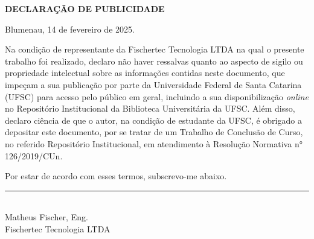 
% 

\begin{center}
	\textbf{DECLARAÇÃO DE PUBLICIDADE}
\end{center}



Blumenau, 14 de fevereiro de 2025.

\vspace{1cm}

Na condição de representante da Fischertec Tecnologia LTDA na qual o presente trabalho foi realizado, declaro não haver ressalvas quanto ao aspecto de sigilo ou propriedade intelectual sobre as informações contidas neste documento, que impeçam a sua publicação por parte da Universidade Federal de Santa Catarina (UFSC) para acesso pelo público em geral, incluindo a sua disponibilização \emph{online} no Repositório Institucional da Biblioteca Universitária da UFSC. Além disso, declaro ciência de que o autor, na condição de estudante da UFSC, é obrigado a depositar este documento, por se tratar de um Trabalho de Conclusão de Curso, no referido Repositório Institucional, em atendimento à Resolução Normativa n° 126/2019/CUn.

Por estar de acordo com esses termos, subscrevo-me abaixo.

\vspace{15mm}

\begin{center}
	\rule{7cm}{0.7pt} \\
	Matheus Fischer, Eng. \\
	Fischertec Tecnologia LTDA
\end{center}

\cleardoublepage

% 

% 	


